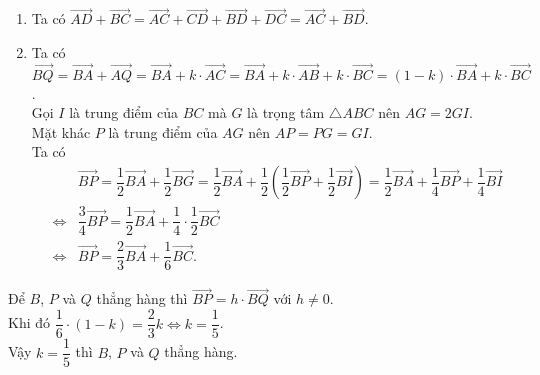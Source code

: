 \begin{bt}
{		\begin{enumerate}
			\item	Ta có $\overrightarrow{AD}+\overrightarrow{BC}=\overrightarrow{AC}+\overrightarrow{CD}+\overrightarrow{BD}+\overrightarrow{DC}=\overrightarrow{AC}+\overrightarrow{BD}$.
			\item Ta có $\overrightarrow{BQ}=\overrightarrow{BA}+\overrightarrow{AQ}=\overrightarrow{BA}+k\cdot\overrightarrow{AC}=\overrightarrow{BA}+k\cdot\overrightarrow{AB}+k\cdot \overrightarrow{BC}=(1-k)\cdot \overrightarrow{BA}+k\cdot \overrightarrow{BC}$.\\
			Gọi $I$ là trung điểm của $BC$ mà $G$ là trọng tâm $\triangle ABC$ nên $AG=2GI$.\\
			Mặt khác $P$ là trung điểm của $AG$ nên $AP=PG=GI$.\\
			Ta có 
			\begin{eqnarray*}
				& & \overrightarrow{B P}=\dfrac 12\overrightarrow{B A}+\dfrac 12\overrightarrow{B G}=\dfrac 12\overrightarrow{B A}+\dfrac 12\left(\dfrac 12\overrightarrow{B P}+\dfrac 12\overrightarrow{B I}\right)=\dfrac 12\overrightarrow{B A}+\dfrac 14\overrightarrow{B P}+\dfrac 14\overrightarrow{B I}\\
				&\Leftrightarrow & \dfrac 34\overrightarrow{B P}=\dfrac 12\overrightarrow{B A}+\dfrac 14\cdot\dfrac 12\overrightarrow{B C}\\
				&\Leftrightarrow & \overrightarrow{B P}=\dfrac 23\overrightarrow{B A}+\dfrac 16\overrightarrow{BC}.
			\end{eqnarray*}
		\end{enumerate}	
		Để 	$B$, $P$ và $Q$ thẳng hàng thì $\overrightarrow{BP}=h\cdot \overrightarrow{BQ}$ với $h\ne 0$.\\
		Khi đó $\dfrac{1}{6}\cdot (1-k)=\dfrac{2}{3}k\Leftrightarrow k=\dfrac{1}{5}$.\\
		Vậy $k=\dfrac{1}{5}$ thì $B$, $P$ và $Q$ thẳng hàng.
	}
\end{bt}